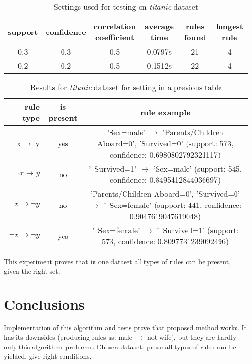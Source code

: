 \documentclass{article}
\begin{document}
	\begin{table}[H]
		\centering
		\label{ts}
		\begin{tabular}{c |c |c|c|c|c}
			support&confidence&\makecell{correlation\\coefficient}&average time&rules found&longest rule\\
			\hline
			\hline
			0.3&0.3&0.5&0.0797s&21&4\\
			\hline
			0.2&0.2&0.5&0.1512s&22&4\\
		\end{tabular}
		\caption{Settings used for testing on \textit{titanic} dataset}
	\end{table}
	\begin{table}[H]
		\centering
		\label{tr}
		\begin{tabular}{r|c |c}
			rule type& is present & rule example\\
			\hline
			\hline
			x$\rightarrow$ y & yes &\makecell{'Sex=male' $\rightarrow$\\ 'Parents/Children Aboard=0', 'Survived=0'\\ (support: 573, confidence: 0.6980802792321117)} \\
			\hline
			$\neg x\rightarrow y$ & no &\makecell{'~Survived=1' $\rightarrow$\\ 'Sex=male'\\ (support: 545, confidence: 0.8495412844036697)}\\
			\hline
			$x\rightarrow \neg y $& no &\makecell{'Parents/Children Aboard=0', 'Survived=0' $\rightarrow$\\ '~Sex=female'\\ (support: 441, confidence: 0.9047619047619048)}\\
			\hline
			$\neg x\rightarrow \neg y $& yes &\makecell{'~Sex=female' $\rightarrow$\\ '~Survived=1'\\ (support: 573, confidence: 0.8097731239092496)} \\ 
		\end{tabular}
		\caption{Results for \textit{titanic} dataset for setting in a previous table}
	\end{table}
	This experiment proves that in one dataset all types of rules can be present, given the right set.
	
	\section{Conclusions}
	Implementation of this algorithm and tests prove that proposed method works. It has its downsides (producing rules as: male $\rightarrow$ not wife), but they are hardly only this algorithms problems. Chosen datasets prove all types of rules can be yielded, give right conditions.
\end{document}
